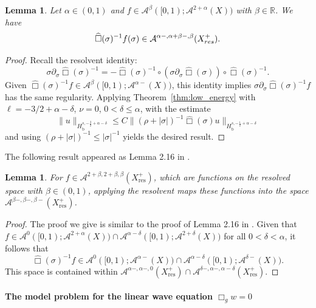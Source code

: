 \documentclass[10pt,a4paper,reqno]{amsart}
\newcommand{\Hb}{H_\text{b}}
\newcommand{\inv}{^{-1}}
\newcommand{\f}{\frac}
\let\hat\widehat
\newtheorem{lemma}[theorem]{Lemma}
\theoremstyle{definition}
\theoremstyle{remark}
\numberwithin{equation}{section}
\newcommand{\x}{\alpha}
\newcommand{\xb}{\beta}
\newcommand{\xd}{\delta}
\newcommand{\xs}{\sigma}
\newcommand{\R}{\mathbb R}
\newcommand{\cA}{\mathcal A}
\newcommand{\wh}{\widehat}
\begin{document}
\begin{lemma}\label{lem:aux}
Let $\alpha\in(0,1)$ and $f\in \cA^{\beta}([0,1);\cA^{2+\x}(X))$ with $\beta\in\R$. We have
$$\hat\Box(\xs)\inv f (\sigma)\in \cA^{\x-,\x+\xb-,\xb}(X^{+}_{{\rm res}}).$$
\end{lemma}
\begin{proof}
Recall the resolvent identity:
$$\sigma\partial_\sigma \wh\Box(\sigma)^{-1} = - \wh\Box(\sigma)^{-1} \circ (\sigma\partial_\sigma \wh\Box(\sigma)) \circ \wh\Box(\sigma)^{-1}.$$
Given $\wh\Box(\sigma)^{-1}f \in \mathcal{A}^{\beta}([0,1); \mathcal{A}^{\alpha-}(X))$, this identity implies $\sigma\partial_\sigma \wh\Box(\sigma)^{-1}f$ has the same regularity. Applying Theorem~\ref{thm:low_energy} with $\ell = -3/2 + \alpha - \delta$, $\nu = 0$, $0 < \delta \leq \alpha$, with the estimate 
\[ \|u\|_{\Hb^{s,-\f32 + \x - \xd}} \leq C \|(\rho+|\sigma|)^{-1}\wh\Box(\sigma)u\|_{\Hb^{s,-\f12 + \x - \xd}} \]
and using $(\rho + |\sigma|)^{-1} \leq |\sigma|^{-1}$ yields the desired result.
\end{proof}

The following result appeared as Lemma 2.16 in \cite{Hin22}.
\begin{lemma}
\label{lem:lem2.16}
For $f \in \mathcal{A}^{2+\beta, 2+\beta, \beta}(X_{\text{res}}^+)$, which are functions on the resolved space with $\beta \in (0,1)$, applying the resolvent maps these functions into the space $\mathcal{A}^{\beta-, \beta-, \beta-}(X_{\text{res}}^+)$.
\end{lemma}

\begin{proof}
The proof we give is similar to the proof of Lemma 2.16 in \cite{Hin22}. Given that $f \in \mathcal{A}^0([0, 1);\mathcal{A}^{2+\alpha}(X)) \cap \mathcal{A}^{\alpha-\delta}([0, 1);\mathcal{A}^{2+\delta}(X))$ for all $0 < \delta < \alpha$, it follows that
$$\hat\Box(\sigma)^{-1} f \in \mathcal{A}^0([0, 1);\mathcal{A}^{\alpha-}(X)) \cap \mathcal{A}^{\alpha-\delta}([0, 1);\mathcal{A}^{\delta-}(X)).$$
This space is contained within $\mathcal{A}^{\alpha-, \alpha-, 0}(X_{\text{res}}^+) \cap \mathcal{A}^{\delta-, \alpha-, \alpha-\delta}(X_{\text{res}}^+)$.
\end{proof}

\paragraph{\bf The model problem for the linear wave equation $\Box_g w = 0$}
\end{document}

